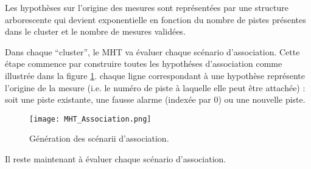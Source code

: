 \documentclass[10pt,french,a4paper]{report}
\begin{document}
 Les hypothèses sur l'origine des mesures sont représentées par une  structure arborescente qui devient exponentielle en fonction du nombre de pistes présentes dans le cluster et le nombre de mesures validées. 
 
 Dans chaque ``cluster'', le \ac{MHT} va évaluer chaque scénario d'association. Cette étape commence par construire toutes les hypothéses d'association comme illustrée dans la figure \ref{fig:SectionHypotheses}.  chaque ligne correspondant à une hypothèse représente l'origine de la mesure (i.e. le numéro de piste à laquelle elle peut être attachée) : soit une piste existante, une fausse alarme (indexée par 0) ou une nouvelle piste.  
 

  \begin{figure}[h!]
  \begin{center}
 \texttt{[image: MHT\_Association.png]}
\caption{Génération des scénarii d'association.}
 \label{fig:SectionHypotheses}
 \end{center}
 \end{figure}

 
 Il reste maintenant à évaluer chaque scénario d'association.
 
\end{document}
